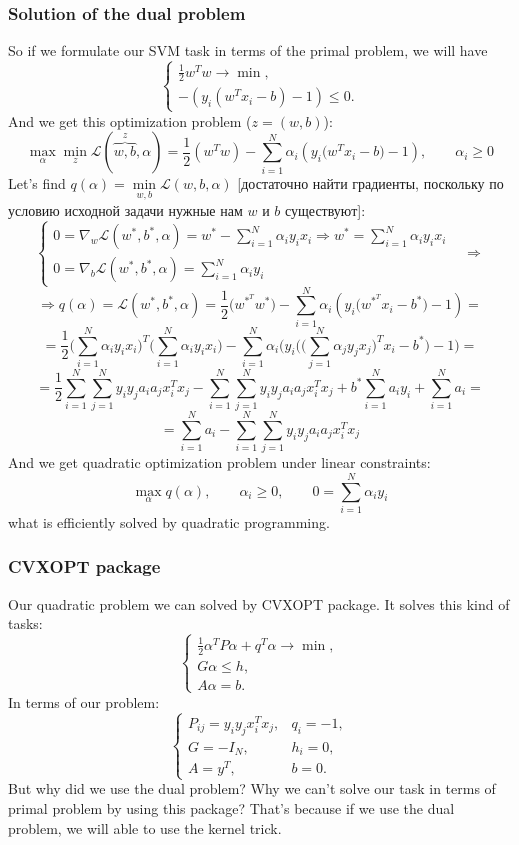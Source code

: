 \subsubsection*{Solution of the dual problem}

So if we formulate our SVM task in terms of the primal problem, we will have
$$\begin{cases}
	\frac{1}{2}w^Tw\to\min, \\
	-(y_i(w^Tx_i-b)-1)\le0.
\end{cases}$$
And we get this optimization problem ($z=(w,b)$):
$$\max\limits_{\alpha}\min\limits_{z}\mathcal{L}(\overbrace{w,b}^z,\alpha)=\frac{1}{2}(w^Tw)-\sum\limits_{i=1}^{N}\alpha_i(y_i\big(w^Tx_i-b\big)-1),\qquad\alpha_i\ge0$$
Let's find $q(\alpha)=\min\limits_{w,b}\mathcal{L}(w,b,\alpha)$ [достаточно найти градиенты, поскольку по условию исходной задачи нужные нам $w$ и $b$ существуют]:
$$\begin{cases}
	0=\nabla_w\mathcal{L}(w^*,b^*,\alpha)=w^*-\sum\limits_{i=1}^{N}\alpha_iy_ix_i\Rightarrow w^*=\sum\limits_{i=1}^{N}\alpha_iy_ix_i &  \\
	0=\nabla_b\mathcal{L}(w^*,b^*,\alpha)=\sum\limits_{i=1}^{N}\alpha_iy_i & 
\end{cases}\Longrightarrow$$
$$\Longrightarrow q(\alpha)=\mathcal{L}(w^*,b^*,\alpha)=\frac{1}{2}\big(w^{*^T}w^*\big)-\sum\limits_{i=1}^{N}\alpha_i(y_i\big(w^{*^T}x_i-b^*\big)-1)=$$
$$=\frac{1}{2}\Big(\sum\limits_{i=1}^{N}\alpha_iy_ix_i\Big)^T\Big(\sum\limits_{i=1}^{N}\alpha_iy_ix_i\Big)-\sum\limits_{i=1}^{N}\alpha_i\big(y_i\Big(\Big(\sum\limits_{j=1}^{N}\alpha_jy_jx_j\Big)^Tx_i-b^*\Big)-1\big)=$$
$$=\frac{1}{2}\sum\limits_{i=1}^{N}\sum\limits_{j=1}^{N}y_iy_ja_ia_jx_i^Tx_j-\sum\limits_{i=1}^{N}\sum\limits_{j=1}^{N}y_iy_ja_ia_jx_i^Tx_j+b^*\sum\limits_{i=1}^{N}a_iy_i+\sum\limits_{i=1}^{N}a_i=$$
$$=\sum\limits_{i=1}^{N}a_i-\sum\limits_{i=1}^{N}\sum\limits_{j=1}^{N}y_iy_ja_ia_jx_i^Tx_j$$
And we get quadratic optimization problem under linear constraints:
$$\max\limits_{\alpha}q(\alpha),\qquad\alpha_i\ge0,\qquad 0=\sum\limits_{i=1}^{N}\alpha_iy_i$$
what is efficiently solved by quadratic programming.

\subsubsection*{CVXOPT package}

Our quadratic problem we can solved by CVXOPT package. It solves this kind of tasks:
$$\begin{cases}
	\frac{1}{2}\alpha^TP\alpha+q^T\alpha\to\min,\\
	G\alpha\le h, \\
	A\alpha=b.
\end{cases}$$
In terms of our problem:
$$\begin{cases}
	P_{ij}=y_iy_jx_i^Tx_j, & q_i=-1, \\
	G=-I_N, & h_i = 0, \\
	A=y^T, & b = 0.
\end{cases}$$
But why did we use the dual problem? Why we can't solve our task in terms of primal problem by using this package? That's because if we use the dual problem, we will able to use the kernel trick.

